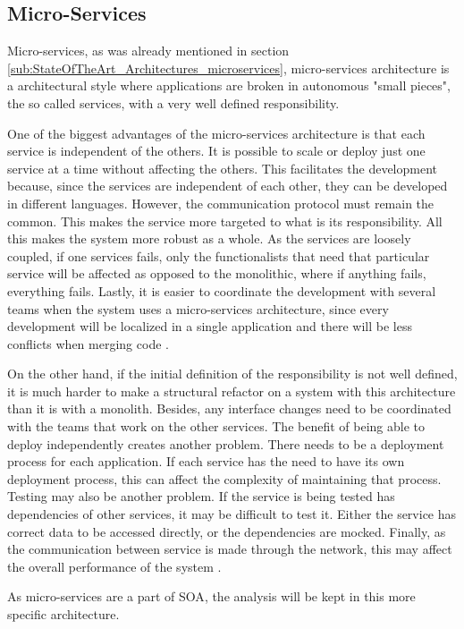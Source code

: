 \subsection{Micro-Services}
Micro-services, as was already mentioned in section \ref{sub:StateOfTheArt_Architectures_microservices}, micro-services architecture is a architectural style where applications are broken in autonomous "small pieces", the so called services, with a very well defined responsibility. 
\par
One of the biggest advantages of the micro-services architecture is that each service is independent of the others. It is possible to scale or deploy just one service at a time without affecting the others. This facilitates the development because, since the services are independent of each other, they can be developed in different languages. However, the communication protocol must remain the common. This makes the service more targeted to what is its responsibility. All this makes the system more robust as a whole. As the services are loosely coupled, if one services fails, only the functionalists that need that particular service will be affected as opposed to the monolithic, where if anything fails, everything fails. Lastly, it is easier to coordinate the development with several teams when the system uses a micro-services architecture, since every development will be localized in a single application and there will be less conflicts when merging code \parencite{microservicesProsAndCons}.
\par
On the other hand, if the initial definition of the responsibility is not well defined, it is much harder to make a structural refactor on a system with this architecture than it is with a monolith. Besides, any interface changes need to be coordinated with the teams that work on the other services. The benefit of being able to deploy independently creates another problem. There needs to be a deployment process for each application. If each service has the need to have its own deployment process, this can affect the complexity of maintaining that process. Testing may also be another problem. If the service is being tested has dependencies of other services, it may be difficult to test it. Either the service has correct data to be accessed directly, or the dependencies are mocked. Finally, as the communication between service is made through the network, this may affect the overall performance of the system \parencite{microservicesProsAndCons}.

As micro-services are a part of \gls{SOA}, the analysis will be kept in this more specific architecture. 

